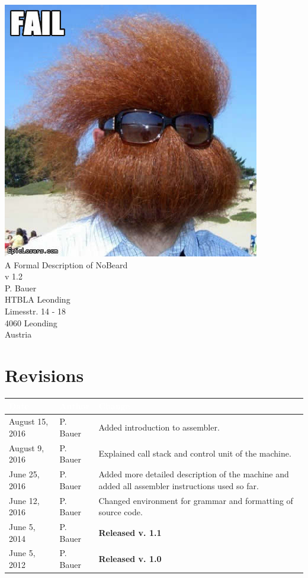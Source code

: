 \documentclass[11pt]{report}
\newcommand{\leongage}{NoBeard}
\begin{document}
\begin{titlepage}
\begin{center}
\includegraphics[scale=0.3]{no_beard_1.jpg} \\[2em]
{\Huge A Formal Description of \leongage} \\[1em]
{\large v 1.2} \\[2em]
{\Large P. Bauer} \\[1em]
HTBLA Leonding \\
Limesstr. 14 - 18 \\
4060 Leonding \\
Austria
\end{center}
\end{titlepage}

\section*{Revisions}
\begin{tabular}{|l|l|p{}|}
\hline
\cellcolor{Gray}\textcolor{White}{Date} & \cellcolor{Gray}\textcolor{White}{Author} & \cellcolor{Gray}\textcolor{White}{Change} \\ \hline
August 15, 2016 & P. Bauer & Added introduction to assembler.  \\ \hline
August 9, 2016 & P. Bauer & Explained call stack and control unit of the machine.  \\ \hline
June 25, 2016 & P. Bauer & Added more detailed description of the machine and added all assembler instructions used so far.  \\ \hline
June 12, 2016 & P. Bauer & Changed environment for grammar and formatting of source code. \\ \hline
June 5, 2014 & P. Bauer & {\bf Released v. 1.1}  \\ \hline
June 5, 2012 & P. Bauer & {\bf Released v. 1.0}  \\ \hline
\end{tabular}
\end{document}
